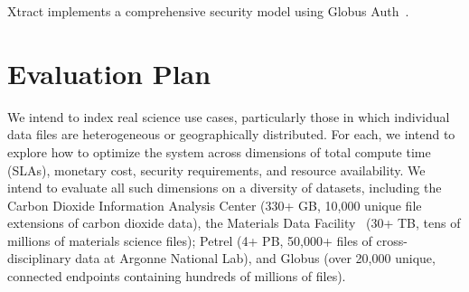 \documentclass[sigconf, 9pt]{acmart}
\newcommand{\tyler}[1]{}
\newcommand{\tyler}[1]{{\textcolor{cyan}{ tyler: #1 }}}
\newcommand{\name}{Xtract}
\begin{document}
\name{} implements a comprehensive security model using Globus Auth~\cite{tuecke2016globus}. 


\section{Evaluation Plan}
\label{sec:eval}

We intend to index real science use cases, particularly those in which individual data files are heterogeneous 
or geographically distributed. For each, we intend to explore how to optimize the system across dimensions of 
total compute time (SLAs), monetary cost, security requirements, and resource availability.  We intend to evaluate 
all such dimensions on a diversity of datasets, including the Carbon Dioxide Information Analysis Center (330+ GB, 10,000 
unique file extensions of carbon dioxide data), the Materials Data Facility~\cite{ blaiszik2019mdf} (30+ TB, tens of millions of materials science files); 
Petrel (4+ PB, 50,000+ files of cross-disciplinary data at Argonne National Lab), and Globus (over 20,000 unique, connected 
endpoints containing hundreds of millions of files). \tyler{fact check Globus}
\end{document}
